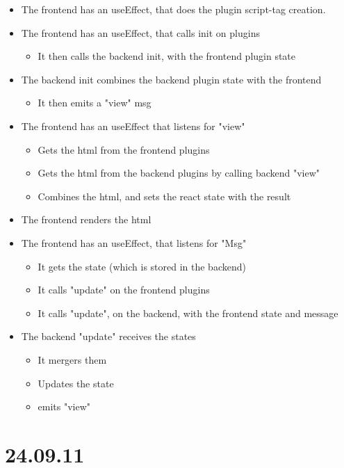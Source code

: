 \begin{itemize}
  \item The frontend has an useEffect, that does the plugin script-tag creation.
  \item The frontend has an useEffect, that calls init on plugins
  \begin{itemize}
    \item It then calls the backend init, with the frontend plugin state
  \end{itemize}
  \item The backend init combines the backend plugin state with the frontend
  \begin{itemize}
    \item It then emits a "view" msg
  \end{itemize}
  \item The frontend has an useEffect that listens for "view"
  \begin{itemize}
    \item Gets the html from the frontend plugins
    \item Gets the html from the backend plugins by calling backend "view"
    \item Combines the html, and sets the react state with the result
  \end{itemize}
  \item The frontend renders the html
  \item The frontend has an useEffect, that listens for "Msg"
  \begin{itemize}
    \item It gets the state (which is stored in the backend)
    \item It calls "update" on the frontend plugins
    \item It calls "update", on the backend, with the frontend state and message
  \end{itemize}
  \item The backend "update" receives the states
  \begin{itemize}
    \item It mergers them
    \item Updates the state
    \item emits "view"
  \end{itemize}
\end{itemize}


\section{24.09.11}

